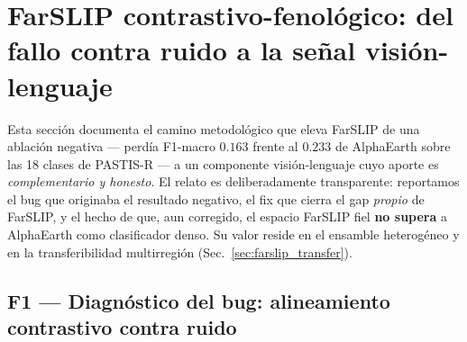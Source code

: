 %
%

\section{FarSLIP contrastivo-fenológico: del fallo contra ruido a la señal
visión-lenguaje}
\label{sec:farslip_method}

Esta sección documenta el camino metodológico que eleva FarSLIP de una
ablación negativa --- perdía F1-macro $0.163$ frente al $0.233$ de AlphaEarth
sobre las 18 clases de PASTIS-R --- a un componente visión-lenguaje cuyo aporte
es \textit{complementario y honesto}. El relato es deliberadamente transparente:
reportamos el bug que originaba el resultado negativo, el fix que cierra el gap
\textit{propio} de FarSLIP, y el hecho de que, aun corregido, el espacio FarSLIP
fiel \textbf{no supera} a AlphaEarth como clasificador denso. Su valor reside en
el ensamble heterogéneo y en la transferibilidad multirregión (Sec.~\ref{sec:farslip_transfer}).

\subsection{F1 --- Diagnóstico del bug: alineamiento contrastivo contra ruido}
\label{sec:farslip_f1}

